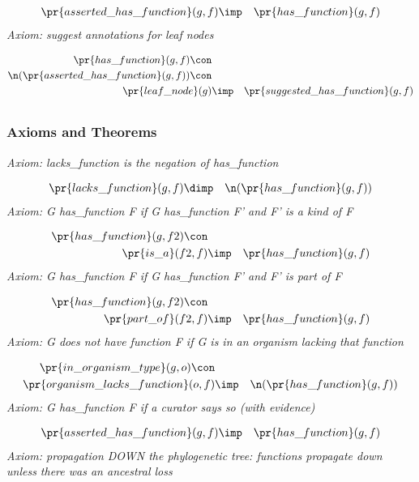 \begin{eqnarray*}
 \pr{asserted\_has\_function}(g, f) &\imp & \pr{has\_function}(g, f) 
\end{eqnarray*}
\emph{Axiom: suggest annotations for leaf nodes}

\begin{eqnarray*}
 \pr{has\_function}(g, f) \con \\
 \n( \pr{asserted\_has\_function}(g, f) )\con \\
 \pr{leaf\_node}(g) &\imp & \pr{suggested\_has\_function}(g, f) 
\end{eqnarray*}
\subsection*{ }
\subsubsection*{Axioms and Theorems}

\emph{Axiom: lacks\_function is the negation of has\_function}

\begin{eqnarray*}
 \pr{lacks\_function}(g, f) &\dimp & \n( \pr{has\_function}(g, f) )
\end{eqnarray*}
\emph{Axiom: G has\_function F if G has\_function F' and F' is a kind of F}

\begin{eqnarray*}
 \pr{has\_function}(g, f2) \con \\
 \pr{is\_a}(f2, f) &\imp & \pr{has\_function}(g, f) 
\end{eqnarray*}
\emph{Axiom: G has\_function F if G has\_function F' and F' is part of F}

\begin{eqnarray*}
 \pr{has\_function}(g, f2) \con \\
 \pr{part\_of}(f2, f) &\imp & \pr{has\_function}(g, f) 
\end{eqnarray*}
\emph{Axiom: G does not have function F if G is in an organism lacking that function}

\begin{eqnarray*}
 \pr{in\_organism\_type}(g, o) \con \\
 \pr{organism\_lacks\_function}(o, f) &\imp & \n( \pr{has\_function}(g, f) )
\end{eqnarray*}
\emph{Axiom: G has\_function F if a curator says so (with evidence)}

\begin{eqnarray*}
 \pr{asserted\_has\_function}(g, f) &\imp & \pr{has\_function}(g, f) 
\end{eqnarray*}
\emph{Axiom: propagation DOWN the phylogenetic tree: functions propagate down unless there was an ancestral loss}

